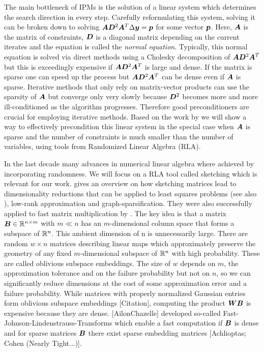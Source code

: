 The main bottleneck of IPMs is the solution of a linear system which determines the search direction in every step.
Carefully reformulating this system, solving it can be broken down to solving \(\bm{A} \bm{D}^2 \bm{A}^T \Delta \bm{y} = \bm{p}\) for some vector \(\bm{p}\).
Here, \(\bm{A}\) is the matrix of constraints, \(\bm{D}\) is a diagonal matrix depending on the current iterates and the equation is called the \emph{normal equation}.
Typically, this normal equation is solved via direct methods using a Cholesky decomposition of \(\bm{A} \bm{D}^2 \bm{A}^T\) \cite[p. 17]{Wright-PrimalDualInteriorPointMethods} but this is exceedingly expensive if \(\bm{A} \bm{D}^2 \bm{A}^T\) is large and dense.
If the matrix is sparse one can speed up the process \cite{NgPeyton-SparseCholesky} but \(\bm{A} \bm{D}^2 \bm{A}^T\) can be dense even if \(\bm{A}\) is sparse.
Iterative methods that only rely on matrix-vector products can use the sparsity of \(\bm{A}\) but converge only very slowly because \(\bm{D}^2\) becomes more and more ill-conditioned as the algorithm progresses.
Therefore good preconditioners are crucial for employing iterative methods.
Based on the work by \textcite{Avron-FasterRandomizedInfeasibleIPMs} we will show a way to effectively precondition this linear system in the special case when \(\bm{A}\) is sparse and the number of constraints is much smaller than the number of variables, using tools from Randomized Linear Algebra (RLA).

In the last decade many advances in numerical linear algebra where achieved by incorporating randomness.
We will focus on a RLA tool called sketching which is relevant for our work.
\textcite{Woodruff-Sketching} gives an overview on how sketching matrices lead to dimensionality reductions that can be applied to least squares problems (see also \cite{Avron-Blendenpik}), low-rank approximation and graph-sparsification.
They were also successfully applied to fast matrix multiplication by \textcite{Cohen-OptimalApproximateMatrixProduct}.
The key idea is that a matrix \(\bm{B} \in \mathbb{R}^{n \times m}\) with \(m \ll n\) has an \(m\)-dimensional column space that forms a subspace of \(\mathbb{R}^n\).
This ambient dimension of n is unnecessarily large.
There are random \(w \times n\) matrices describing linear maps which approximately preserve the geometry of any fixed \(m\)-dimensional subspace of \(\mathbb{R}^n\) with high probability.
These are called oblivious subspace embeddings.
The size of \(w\) depends on \(m\), the approximation tolerance and on the failure probability but not on \(n\), so we can significantly reduce dimensions at the cost of some approximation error and a failure probability.
While matrices with properly normalized Gaussian entries form oblivious subspace embeddings [Citation], computing the product \(\bm{W}\bm{B}\) is expensive because they are dense.
[AilonChazelle] developed so-called Fast-Johnson-Lindenstrauss-Transforms which enable a fast computation if \(\bm{B}\) is dense and for sparse matrices \(\bm{B}\) there exist sparse embedding matrices [Achlioptas; Cohen (Nearly Tight...)].

